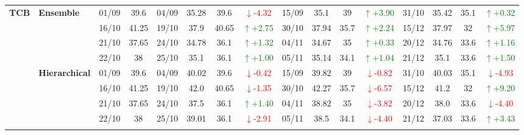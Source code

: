{\begin{longtable}{llcc|cccc|cccc|cccc}
\multirow{12}{*}{\textbf{TCB}} 
& \textbf{Ensemble}
& 01/09 & 39.6 & 04/09 & 35.28 & 39.6 & \textcolor{red}{\(\downarrow\)-4.32} & 15/09 & 35.1 & 39 & \textcolor{green}{\(\uparrow\)+3.90} & 31/10 & 35.42 & 35.1 & \textcolor{green}{\(\uparrow\)+0.32} \\

&
& 16/10 & 41.25 & 19/10 & 37.9 & 40.65 & \textcolor{green}{\(\uparrow\)+2.75} & 30/10 & 37.94 & 35.7 & \textcolor{green}{\(\uparrow\)+2.24} & 15/12 & 37.97 & 32 & \textcolor{green}{\(\uparrow\)+5.97} \\

&
& 21/10 & 37.65 & 24/10 & 34.78 & 36.1 & \textcolor{green}{\(\uparrow\)+1.32} & 04/11 & 34.67 & 35 & \textcolor{green}{\(\uparrow\)+0.33} & 20/12 & 34.76 & 33.6 & \textcolor{green}{\(\uparrow\)+1.16} \\

&
& 22/10 & 38 & 25/10 & 35.1 & 36.1 & \textcolor{green}{\(\uparrow\)+1.00} & 05/11 & 35.14 & 34.1 & \textcolor{green}{\(\uparrow\)+1.04} & 21/12 & 35.1 & 33.6 & \textcolor{green}{\(\uparrow\)+1.50} \\
\cmidrule(lr){2-16}


& \textbf{Hierarchical}
& 01/09 & 39.6 & 04/09 & 40.02 & 39.6 & \textcolor{red}{\(\downarrow\)-0.42} & 15/09 & 39.82 & 39 & \textcolor{red}{\(\downarrow\)-0.82} & 31/10 & 40.03 & 35.1 & \textcolor{red}{\(\downarrow\)-4.93} \\

&
& 16/10 & 41.25 & 19/10 & 42.0 & 40.65 & \textcolor{red}{\(\downarrow\)-1.35} & 30/10 & 42.27 & 35.7 & \textcolor{red}{\(\downarrow\)-6.57} & 15/12 & 41.2 & 32 & \textcolor{green}{\(\uparrow\)+9.20} \\

&
& 21/10 & 37.65 & 24/10 & 37.5 & 36.1 & \textcolor{green}{\(\uparrow\)+1.40} & 04/11 & 38.82 & 35 & \textcolor{red}{\(\downarrow\)-3.82} & 20/12 & 38.0 & 33.6 & \textcolor{red}{\(\downarrow\)-4.40} \\

&
& 22/10 & 38 & 25/10 & 39.01 & 36.1 & \textcolor{red}{\(\downarrow\)-2.91} & 05/11 & 38.5 & 34.1 & \textcolor{red}{\(\downarrow\)-4.40} & 21/12 & 37.03 & 33.6 & \textcolor{green}{\(\uparrow\)+3.43} \\
\cmidrule(lr){2-16}




\end{longtable}}
